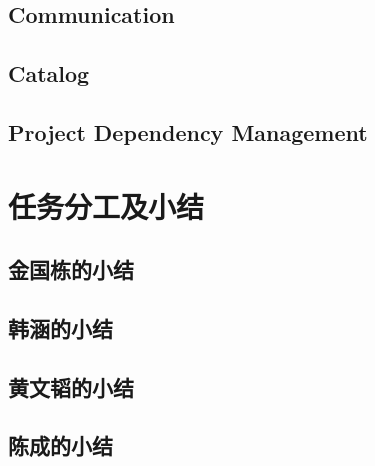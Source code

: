 \documentclass[a4paper, 12pt]{ctexart}
\begin{document}
\subsection{Communication}


\subsection{Catalog}

\subsection{Project Dependency Management}

\section{任务分工及小结}

\subsection{金国栋的小结}

\subsection{韩涵的小结}

\subsection{黄文韬的小结}

\subsection{陈成的小结}





 
\end{document}
